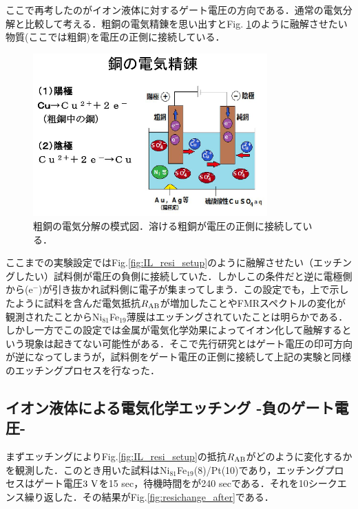 ここで再考したのがイオン液体に対するゲート電圧の方向である．通常の電気分解と比較して考える．粗銅の電気精錬を思い出すとFig. \ref{fig:denkibunkai}のように融解させたい物質(ここでは粗銅)を電圧の正側に接続している．

\begin{figure}[htbp]
\centerline{
\includegraphics[width=9cm]{images/denkibunkai.eps}
}
\caption{粗銅の電気分解の模式図．溶ける粗銅が電圧の正側に接続している．
}
\label{fig:denkibunkai}
\end{figure}

ここまでの実験設定ではFig.\ref{fig:IL_resi_setup}のように融解させたい（エッチングしたい）試料側が電圧の負側に接続していた．しかしこの条件だと逆に電極側から(e$^{-}$)が引き抜かれ試料側に電子が集まってしまう．この設定でも，上で示したように試料を含んだ電気抵抗$R_{\rm AB}$が増加したことやFMRスペクトルの変化が観測されたことからNi$_{81}$Fe$_{19}$薄膜はエッチングされていたことは明らかである．しかし一方でこの設定では金属が電気化学効果によってイオン化して融解するという現象は起きてない可能性がある．そこで先行研究とはゲート電圧の印可方向が逆になってしまうが，試料側をゲート電圧の正側に接続して上記の実験と同様のエッチングプロセスを行なった．\\

\subsection{イオン液体による電気化学エッチング -負のゲート電圧-}


まずエッチングによりFig.\ref{fig:IL_resi_setup}の抵抗$R_{\rm AB}$がどのように変化するかを観測した．このとき用いた試料はNi$_{81}$Fe$_{19}$(8)/Pt(10)であり，エッチングプロセスはゲート電圧$3\rm\ V$を15 sec，待機時間をが240 secである．それを10シークエンス繰り返した．その結果がFig.\ref{fig:resichange_after}である．

